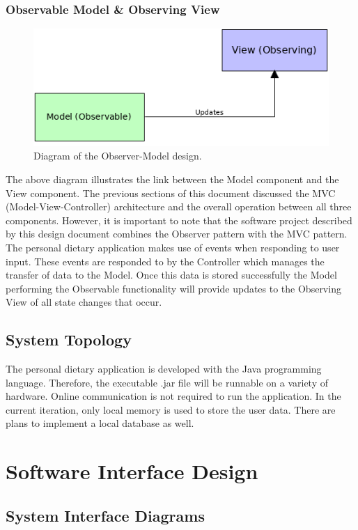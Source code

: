\documentclass{scrreprt}
\begin{document}
\subsection{Observable Model \& Observing View}

\begin{figure}[ht]
\includegraphics{pictures/obs.png}
\caption{Diagram of the Observer-Model design.}
\end{figure}

The above diagram illustrates the link between the Model component and the View component. The previous sections of this document discussed the MVC (Model-View-Controller) architecture and the overall operation between all three components. However, it is important to note that the software project described by this design document combines the Observer pattern with the MVC pattern. The personal dietary application makes use of events when responding to user input. These events are responded to by the Controller which manages the transfer of data to the Model. Once this data is stored successfully the Model performing the Observable functionality will provide updates to the Observing View of all state changes that occur.

\section{System Topology}

The personal dietary application is developed with the Java programming language. Therefore, the executable .jar file will be runnable on a variety of hardware. Online communication is not required to run the application. In the current iteration, only local memory is used to store the user data. There are plans to implement a local database as well.

\chapter{Software Interface Design}
\section{System Interface Diagrams}
\end{document}
